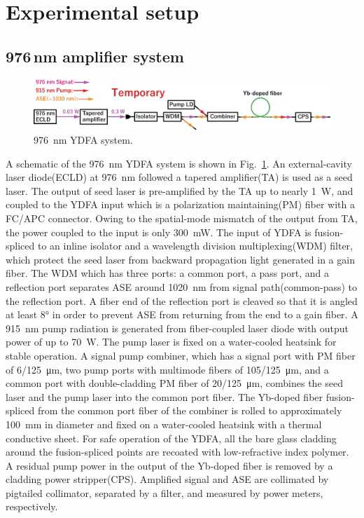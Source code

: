 \documentclass{osa-article}
\begin{document}
\section{Experimental setup}
\subsection{976\,nm amplifier system}

\begin{figure}[h!]
  \centering\includegraphics[width=\linewidth]{./Figure/976nmYDFASystem.eps}
  \caption{\SI{976}{\nm} YDFA system.}
  \label{fig:976YDFASystem}
\end{figure}
A schematic of the \SI{976}{\nm} YDFA system is shown in Fig.~\ref{fig:976YDFASystem}.
An external-cavity laser diode(ECLD) at \SI{976}{\nm} followed a tapered amplifier(TA) is used as a seed laser.
The output of seed laser is pre-amplified by the TA up to nearly \SI{1}{\W}, and coupled to the YDFA input which is a polarization maintaining(PM) fiber with a FC/APC connector.
Owing to the spatial-mode mismatch of the output from TA, the power coupled to the input is only \SI{300}{\mW}.
The input of YDFA is fusion-spliced to an inline isolator and a wavelength division multiplexing(WDM) filter, which protect the seed laser from backward propagation light generated in a gain fiber.
The WDM which has three ports: a common port, a pass port, and a reflection port separates ASE around \SI{1020}{\nm} from signal path(common-pass) to the reflection port.
A fiber end of the reflection port is cleaved so that it is angled at least \ang{8} in order to prevent ASE from returning from the end to a gain fiber.
A \SI{915}{\nm} pump radiation is generated from fiber-coupled laser diode with output power of up to \SI{70}{\W}.
The pump laser is fixed on a water-cooled heatsink for stable operation.
A signal pump combiner, which has a signal port with PM fiber of \SI{6/125}{\um}, two pump ports with multimode fibers of \SI{105/125}{\um}, and a common port with double-cladding PM fiber of \SI{20/125}{\um}, combines the seed laser and the pump laser into the common port fiber.
The Yb-doped fiber fusion-spliced from the common port fiber of the combiner is rolled to approximately \SI{100}{\mm} in diameter and fixed on a water-cooled heatsink with a thermal conductive sheet.
For safe operation of the YDFA, all the bare glass cladding around the fusion-spliced points are recoated with low-refractive index polymer.
A residual pump power in the output of the Yb-doped fiber is removed by a cladding power stripper(CPS).
Amplified signal and ASE are collimated by pigtailed collimator, separated by a filter, and measured by power meters, respectively.
\end{document}
